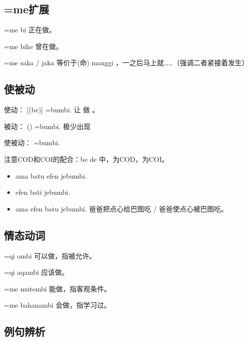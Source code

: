 \subsection{=me扩展}

\begin{des}
    \item[\V =me bi] 正在做。
    \item[\V =me bihe] 曾在做。
    \item[\V =me saka / jaka] 等价于\V (命) manggi ，一\V 之后马上就……（强调二者紧接着发生）
\end{des}

\subsection{使被动}

使动：\A \B {} [\C (be)] \V =bumbi. \A 让 \B 做 \V \C 。

被动：\A \B {} (\C) \V =bumbi. \C 极少出现

使被动：\A \B {} \C {} \V =bumbi. 

注意COD和COI的配合：\A \B be \C de 中，\B 为COD，\C 为COI。

\begin{itemize}
    \item ama batu  efen jebumbi.
    \item efen bati  jebumbi.
    \item ama efen  batu  jebumbi. 爸爸把点心给巴图吃 / 爸爸使点心被巴图吃。
\end{itemize}

\subsection{情态动词}

\begin{des}
    \item[\V =qi ombi] 可以做\V ，指被允许。
    \item[\V =qi aqambi] 应该做\V 。
    \item[\V =me mutembi] 能做\V ，指客观条件。
    \item[\V =me bahanambi] 会做\V ，指学习过。
\end{des}


\subsection{例句辨析}

